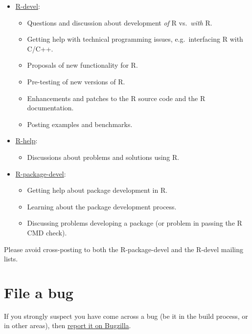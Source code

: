 \documentclass[
]{book}
\providecommand{\tightlist}{%
  \setlength{\itemsep}{0pt}\setlength{\parskip}{0pt}}
\begin{document}
\begin{itemize}
\tightlist
\item
  \href{https://stat.ethz.ch/mailman/listinfo/r-devel}{R-devel}:

  \begin{itemize}
  \tightlist
  \item
    Questions and discussion about development \emph{of} R vs.~\emph{with} R.
  \item
    Getting help with technical programming issues, e.g.~interfacing R with C/C++.
  \item
    Proposals of new functionality for R.
  \item
    Pre-testing of new versions of R.
  \item
    Enhancements and patches to the R source code and the R documentation.
  \item
    Posting examples and benchmarks.
  \end{itemize}
\item
  \href{https://stat.ethz.ch/mailman/listinfo/r-help}{R-help}:

  \begin{itemize}
  \tightlist
  \item
    Discussions about problems and solutions using R.
  \end{itemize}
\item
  \href{https://stat.ethz.ch/mailman/listinfo/r-package-devel}{R-package-devel}:

  \begin{itemize}
  \tightlist
  \item
    Getting help about package development in R.
  \item
    Learning about the package development process.
  \item
    Discussing problems developing a package (or problem in passing the R CMD check).
  \end{itemize}
\end{itemize}

Please avoid cross-posting to both the R-package-devel and the R-devel mailing lists.

\section{File a bug}\label{file-a-bug}

If you strongly suspect you have come across a bug (be it in the build process, or in other areas), then \hyperref[ReportBug]{report it on Bugzilla}.
\end{document}
